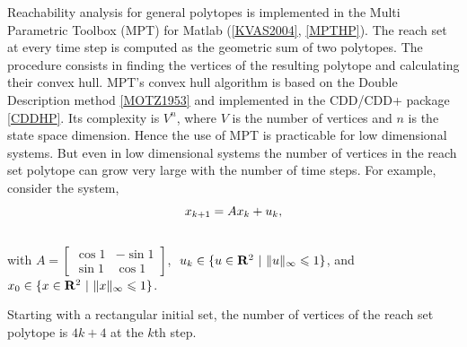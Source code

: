 \documentclass[letterpaper,10pt,english]{sphinxmanual}
\begin{document}
Reachability analysis for general polytopes is implemented in the Multi
Parametric Toolbox (MPT) for Matlab ({\hyperref[main_source:kvas2004]{{[}KVAS2004{]}}}, {\hyperref[main_source:mpthp]{{[}MPTHP{]}}}). The reach set at every time step
is computed as the geometric sum of two polytopes. The procedure
consists in finding the vertices of the resulting polytope and
calculating their convex hull. MPT’s convex hull algorithm is based on
the Double Description method {\hyperref[main_source:motz1953]{{[}MOTZ1953{]}}} and implemented in
the CDD/CDD+ package {\hyperref[main_source:cddhp]{{[}CDDHP{]}}}. Its complexity is
$V^n$, where $V$ is the number of vertices and $n$ is
the state space dimension. Hence the use of MPT is practicable for low
dimensional systems. But even in low dimensional systems the number of
vertices in the reach set polytope can grow very large with the number
of time steps. For example, consider the system,
\begin{gather}
\begin{split}x_{k+1} = Ax_k + u_k ,\end{split}\notag\\\begin{split}\end{split}\notag
\end{gather}
with $A=\left[\begin{array}{cc}\cos 1 & -\sin 1\\ \sin 1 & \cos 1\end{array}\right]$,
$\ u_k \in \{u\in {\bf R}^2 ~|~ \|u\|_{\infty}\leqslant1\}$,
and $x_0 \in \{x\in {\bf R}^2 ~|~ \|x\|_{\infty}\leqslant1\}$.

Starting with a rectangular initial set, the number of vertices of the
reach set polytope is $4k + 4$ at the $k$th step.
\end{document}
